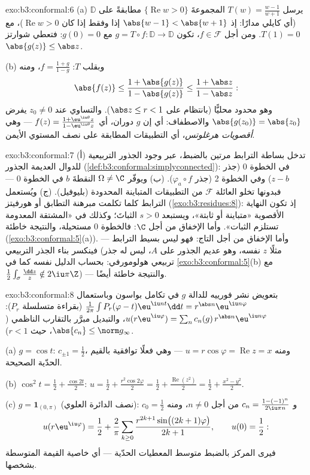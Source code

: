\begin{solution}{exo:b3:conformal:6}
(a) يرسل $T(w) = \frac{w - 1}{w + 1}$ المجموعةَ $\{\operatorname{Re}w >
0\}$ مطابقةً على $\mathbb D$
(أي كايلي مدارًا: إذ $\abs{w -
1} < \abs{w + 1}$ إذا وفقط إذا كان $\operatorname{Re}w > 0$)، مع $T(1) =
0$.
ومن أجل $f \in \mathcal F$، تكون $g = T\circ f\colon \mathbb D \to
\mathbb D$  مع $g(0) = 0$: فتعطي
شوارتز $\abs{g(z)} \leq \abs z$.

(b) وبقلب $T$: $f = \frac{1 + g}{1 - g}$، ومنه
\[
\abs{f(z)} \leq \frac{1 + \abs{g(z)}}{1 - \abs{g(z)}}
\leq \frac{1 + \abs z}{1 - \abs z} :
\]
وهو محدود محليًّا (بانتظام على $\abs z \leq r < 1$). والتساوي عند
$z_0 \neq 0$ يفرض $\abs{g(z_0)} = \abs{z_0}$ والاصطفاف: أي إن $g$ دوران، أي $f(z) = \frac{1 +
\eu^{\iu\theta}z}{1 - \eu^{\iu\theta}z}$
--- وهي \emph{أقصويات هرغلوتس}، أي التطبيقات المطابقة على نصف
المستوي الأيمن.
\end{solution}

\begin{solution}{exo:b3:conformal:7}
(أ) تدخل بساطة الترابط مرتين بالضبط، عبر وجود الجذور التربيعية
 للدوال العديمة الجذور (\cref{def:b3:conformal:simplyconnected}): في الخطوة 0
(جذر $z - b$) وفي الخطوة 2 (جذر $\varphi_a\circ f$). (ب) ويوفّر
$\Omega \neq \C$ النقطةَ $b$ في الخطوة 0 --- فبدونها تخلو
العائلة $\mathcal F$ من التطبيقات المتباينة المحدودة
(بليوفيل). (ج) ويُستعمل الترابط كلما تكلمت مبرهنة التطابق أو
هورفيتز (\cref{exo:b3:residues:8}): إذ تكون النهاية الأقصوية «متباينة أو
ثابتة»، ويستبعد $s > 0$ الثباتَ؛ وكذلك في «المشتقة المعدومة
تستلزم الثبات». وأما الإخفاق من أجل $\C$: فالخطوة 0 مستحيلة،
والنتيجة خاطئة (\cref{exo:b3:conformal:5}(a)). وأما الإخفاق من أجل التاج: فهو
ليس بسيط الترابط --- فينكسر بناء الجذر التربيعي (مثلًا $z$
نفسه، وهو عديم الجذور على $A$، ليس له جذر تربيعي هولومورفي:
بحساب الدليل نفسه كما في \cref{exo:b3:conformal:5}(b) مع $\frac12\int_\sigma\frac{\dd z}z \notin 2\iu\pi\Z$) --- والنتيجة
خاطئة أيضًا.
\end{solution}

\begin{solution}{exo:b3:conformal:8}
بتعويض نشر فورييه للدالة $g$ في تكامل بواسون وباستعمال $\frac1{2\pi}\int P_r(\varphi - t)\eu^{\iu nt}\dd t =
r^{\abs n}\eu^{\iu n\varphi}$
(بقراءة متسلسلة $P_r$): $u(r\eu^{\iu\varphi}) = \sum_nc_n(g)\,r^{\abs
n}\eu^{\iu n\varphi}$، والتبديل مبرَّر بالتقارب
الناظمي ($\abs{c_n} \leq \norm g_\infty$، حيث $r < 1$).

(a) $g = \cos t$: $c_{\pm1} = \frac12$، ومنه $u =
r\cos\varphi = \operatorname{Re}z = x$ --- وهي فعلًا توافقية
بالقيم الحدّية الصحيحة.

(b) $\cos^2t = \frac12 + \frac{\cos 2t}2$: $u = \frac12 +
\frac{r^2\cos2\varphi}2 = \frac12 +
\frac{\operatorname{Re}(z^2)}2 = \frac12 + \frac{x^2 -
y^2}{2}$.

(c) $g = \mathbf 1_{(0,\pi)}$ (نصف الدائرة العلوي): $c_0 =
\frac12$ و $c_n = \frac{1 - (-1)^n}{2\iu\pi n}$ من أجل $n \neq
0$،
ومنه
\[
u(r\eu^{\iu\varphi}) = \frac12 + \frac2\pi\sum_{k\geq0}
\frac{r^{2k+1}\sin\bigl((2k+1)\varphi\bigr)}{2k + 1},
\qquad u(0) = \frac12 :
\]
فيرى المركز بالضبط متوسط المعطيات الحدّية --- أي خاصية القيمة
المتوسطة بشخصها.
\end{solution}

